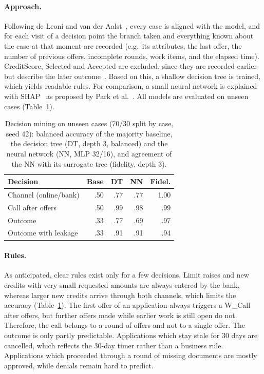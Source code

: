 \documentclass[
  english,        %
  font=times,     %
  twocolumn,      %
]{tumarticle}
\begin{document}
\paragraph{Approach.}
Following de Leoni and van der Aalst~\cite{deleoni2013}, every case is aligned with the model, and for each visit of a decision point the branch taken and everything known about the case at that moment are recorded (e.g.\ its attributes, the last offer, the number of previous offers, incomplete rounds, work items, and the elapsed time). CreditScore, Selected and Accepted are excluded, since they are recorded earlier but describe the later outcome~\cite{vanderham2017}. Based on this, a shallow decision tree is trained, which yields readable rules. For comparison, a small neural network is explained with SHAP~\cite{lundberg2017shap} as proposed by Park et al.~\cite{park2022}. All models are evaluated on unseen cases (Table~\ref{tab:dm}).

\begin{table}[ht]
  \caption{Decision mining on unseen cases (70/30 split by case, seed 42):
  balanced accuracy of the majority baseline, the decision tree (DT, depth 3,
  balanced) and the neural network (NN, MLP 32/16), and agreement of the NN
  with its surrogate tree (fidelity, depth 3).}
  \centering\small
  \setlength{\tabcolsep}{4pt}
  \begin{tabular}{lrrrr}
    \toprule
    \textbf{Decision} & \textbf{Base} & \textbf{DT} & \textbf{NN} & \textbf{Fidel.} \\
    \midrule
    Channel (online/bank) & .50 & .77 & .77 & 1.00 \\
    Call after offers     & .50 & .99 & .98 & .99 \\
    Outcome               & .33 & .77 & .69 & .97 \\
    Outcome with leakage  & .33 & .91 & .91 & .94 \\
    \bottomrule
  \end{tabular}
  \label{tab:dm}
\end{table}

\paragraph{Rules.}
As anticipated, clear rules exist only for a few decisions. Limit raises and new credits with very small requested amounts are always entered by the bank, whereas larger new credits arrive through both channels, which limits the accuracy (Table~\ref{tab:dm}). The first offer of an application always triggers a W\_Call after offers, but further offers made while earlier work is still open do not. Therefore, the call belongs to a round of offers and not to a single offer. The outcome is only partly predictable. Applications which stay stale for 30 days are cancelled, which reflects the 30-day timer rather than a business rule. Applications which proceeded through a round of missing documents are mostly approved, while denials remain hard to predict.
\end{document}
